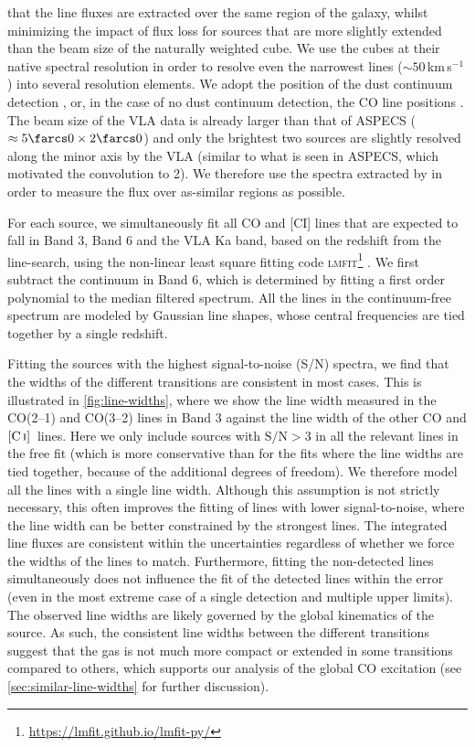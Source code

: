 \documentclass[twocolumn]{aastex62}
\newcommand{\CI}{\ensuremath{\mathrm{[C\, \textsc{i}]}}}
\begin{document}
that the line fluxes are extracted over the same region of the galaxy, whilst
minimizing the impact of flux loss for sources that are more slightly extended
than the beam size of the naturally weighted cube.  We use the cubes at their
native spectral resolution in order to resolve even the narrowest lines
($\sim 50$\,km\,s$^{-1}$) into several resolution elements.  We adopt the
position of the dust continuum detection \citep{Gonzalez-Lopez2020,
  Aravena2020}, or, in the case of no dust continuum detection, the CO line
positions \citep{Gonzalez-Lopez2019, Boogaard2019}.  The beam size of the VLA
data is already larger than that of ASPECS ($\approx 5\farcs0 \times 2\farcs0$)
and only the brightest two sources are slightly resolved along the minor axis
by the VLA (similar to what is seen in ASPECS, which motivated the convolution
to 2).  We therefore use the spectra extracted by \cite{Riechers2020b} in
order to measure the flux over as-similar regions as possible.

For each source, we simultaneously fit all CO and [CI] lines that are expected
to fall in Band 3, Band 6 and the VLA Ka band, based on the redshift from the
line-search, using the non-linear least square fitting code
\textsc{lmfit}\footnote{\url{https://lmfit.github.io/lmfit-py/}}
\citep{Newville2019}.  We first subtract the continuum in Band 6, which is
determined by fitting a first order polynomial to the median filtered spectrum.
All the lines in the continuum-free spectrum are modeled by Gaussian line
shapes, whose central frequencies are tied together by a single redshift.

Fitting the sources with the highest signal-to-noise (S/N) spectra, we find
that the widths of the different transitions are consistent in most cases.
This is illustrated in \autoref{fig:line-widths}, where we show the line width
measured in the CO(2--1) and CO(3--2) lines in Band 3 against the line width of
the other CO and \CI\ lines.  Here we only include sources with
$\mathrm{S/N} > 3$ in all the relevant lines in the free fit (which is more
conservative than for the fits where the line widths are tied together, because
of the additional degrees of freedom).  We therefore model all the lines with a
single line width.  Although this assumption is not strictly necessary, this
often improves the fitting of lines with lower signal-to-noise, where the line
width can be better constrained by the strongest lines.  The integrated line
fluxes are consistent within the uncertainties regardless of whether we force
the widths of the lines to match.  Furthermore, fitting the non-detected lines
simultaneously does not influence the fit of the detected lines within the
error (even in the most extreme case of a single detection and multiple upper
limits).  The observed line widths are likely governed by the global kinematics
of the source.  As such, the consistent line widths between the different
transitions suggest that the gas is not much more compact or extended in some
transitions compared to others, which supports our analysis of the global CO
excitation (see \autoref{sec:similar-line-widths} for further discussion).
\end{document}
